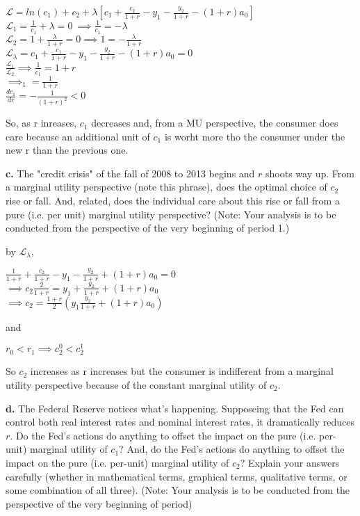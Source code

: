 \documentclass[11pt]{SelfArxOneColBMN}
\begin{document}
\begin{solution}
  \begin{center}
    $\mathcal{L} = ln(c_1) + c_2 + \lambda[c_1 + \frac{c_2}{1 + r} - y_1 - \frac{y_2}{1 + r} - (1 +r)a_0]$\\
    $\mathcal{L}_1 = \frac{1}{c_1} + \lambda = 0 \ \implies \frac{1}{c_1} = -\lambda$\\
    $\mathcal{L}_2 = 1 + \frac{\lambda}{1 + r} = 0 \implies 1 = -\frac{\lambda}{1 +r}$\\
    $\mathcal{L}_\lambda = c_1 + \frac{c_1}{1 + r} - y_1 - \frac{y_2}{1 + r} - (1 + r)a_0 = 0$\\
    $\frac{\mathcal{L}_1}{\mathcal{L}_2} \implies \frac{1}{c_1} = 1 + r$\\
    $\implies _1 = \frac{1}{1 + r}$\\
    $\frac{dc_1}{dr} = -\frac{1}{(1 + r)^2} < 0$
  \end{center}
  \noindent So, as r inreases, $c_1$ decreases and, from a MU perspective, the consumer does care because an additional unit of $c_1$ is worht more tho the consumer under the new r than the previous one. 
\end{solution}
\noindent \textbf{c.} The "credit crisis" of the fall of 2008 to 2013 begins and $r$ shoots way up. From a marginal utility perspective (note this phrase), does the optimal choice of $c_2$ rise or fall. And, related, does the individual care about this rise or fall from a pure (i.e. per unit) marginal utility perspective? (Note: Your analysis is to be conducted from the perspective of the very beginning of period 1.)\\
\begin{solution}
  by $\mathcal{L}_\lambda,$
  \begin{center}
    $\frac{1}{1 + r} + \frac{c_2}{1 + r} - y_1 - \frac{y_2}{1 + r} + (1 + r)a_0 = 0$\\
    $\implies c_2\frac{2}{1 + r} = y_1 + \frac{y_2}{1 + r} + (1 + r)a_0$\\
    $\implies c_2 = \frac{1 + r}{2}(y_1 \frac{y_2}{1 + r} + (1 + r)a_0)$
  \end{center}
  \noindent and
  \begin{center}
    $r_0 < r_1 \implies c_2^0 < c_2^1$
  \end{center}
  \noindent So $c_2$ increases as r increases but the consumer is indifferent from a marginal utility perspective because of the constant marginal utility of $c_2$.
\end{solution}
\noindent \textbf{d.} The Federal Reserve notices what's happening. Supposeing that the Fed can control both real interest rates and nominal interest rates, it dramatically reduces $r$. Do the Fed's actions do anything to offset the impact on the pure (i.e. per-unit) marginal utility of $c_1$? And, do the Fed's actions do anything to offset the impact on the pure (i.e. per-unit) marginal utility of $c_2$? Explain your answers carefully (whether in mathematical terms, graphical terms, qualitative terms, or some combination of all three). (Note: Your analysis is to be conducted from the perspective of the very beginning of period)\\
\end{document}
